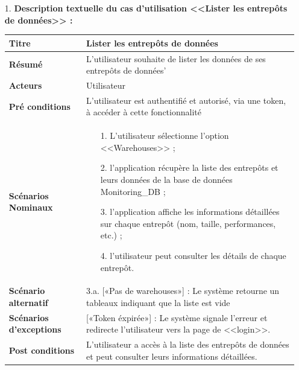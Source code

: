 \begin{enumerate}
    \item[1.] \textbf{Description textuelle du cas d'utilisation <<Lister les entrepôts de données>> :}
    \begin{table}[H]
        \centering
            \begin{tabular}{|p{3.5cm}|p{12cm}|}
                \hline \textbf{Titre} &  Lister les entrepôts de données \\
                \hline \textbf{Résumé} & L'utilisateur souhaite de lister les données de ses entrepôts de données' \\
                \hline \textbf{Acteurs} & Utilisateur\\
                \hline \textbf{Pré conditions }& L'utilisateur est authentifié et autorisé, via une token, à accéder à cette fonctionnalité\\
                \hline \textbf{Scénarios Nominaux} &
                    \begin{enumerate}
                        \item [1.] L'utilisateur sélectionne l'option <<Warehouses>> ;
                        \item [2.] l'application récupère la liste des entrepôts et leurs données de la base de données Monitoring\_DB ;
                        \item [3.] l'application affiche les informations détaillées sur chaque entrepôt (nom, taille, performances, etc.) ;
                        \item [4.] l'utilisateur peut consulter les détails de chaque entrepôt.      
                    \end{enumerate}\\
                        \hline \textbf{Scénario alternatif} & 
                        3.a. \hspace{0.3cm} [«Pas de warehouses»] : Le système retourne un tableaux indiquant que la liste est vide \newline\\
                \hline  \textbf{Scénarios d'exceptions} & 
                    [«Token éxpirée»] : Le système signale l'erreur et redirecte l'utilisateur vers la page de <<login>>.\\
                \hline \textbf{Post conditions} & L'utilisateur a accès à la liste des entrepôts de données et peut consulter leurs informations détaillées.
         \\
                \hline
            \end{tabular}

\end{table}
\end{enumerate}
